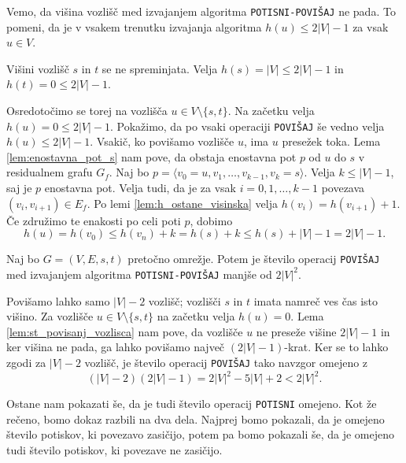 \documentclass[mat1]{fmfdelo}
\begin{document}
\begin{opomba}
Vemo, da višina vozlišč med izvajanjem algoritma \texttt{POTISNI-POVIŠAJ} ne pada. To pomeni, da je v vsakem trenutku izvajanja algoritma $h(u) \leq 2|V| - 1$ za vsak $u \in V$.
\end{opomba}

\begin{dokaz}
Višini vozlišč $s$ in $t$ se ne spreminjata. Velja $h(s) = |V| \leq 2|V| -1$ in $h(t) = 0 \leq 2|V|-1$.

Osredotočimo se torej na vozlišča $u \in V \setminus \{s,t\}$. Na začetku velja $h(u) = 0 \leq 2|V|-1$. Pokažimo, da po vsaki operaciji \texttt{POVIŠAJ} še vedno velja $h(u) \leq 2|V|-1$. Vsakič, ko povišamo vozlišče $u$, ima $u$ presežek toka. Lema \ref{lem:enostavna_pot_s} nam pove, da obstaja enostavna pot $p$ od $u$ do $s$ v residualnem grafu $G_f$. Naj bo $p = \langle v_0 = u, v_1, \dotsc, v_{k-1}, v_k = s\rangle$. Velja $k \leq |V|-1$, saj je $p$ enostavna pot. Velja tudi, da je za vsak $i = 0,1,\dotsc,k-1$ povezava $(v_i, v_{i+1}) \in E_f$. Po lemi \ref{lem:h_ostane_visinska} velja $h(v_i) = h(v_{i+1}) +1$. Če združimo te enakosti po celi poti $p$, dobimo \[h(u) = h(v_0) \leq h(v_n) + k = h(s) + k \leq h(s) + |V| - 1 = 2|V| - 1.\]
\end{dokaz}

\begin{posledica}\label{pos:om_st_op_povisaj}
Naj bo $G=(V,E,s,t)$ pretočno omrežje. Potem je število operacij \texttt{POVIŠAJ} med izvajanjem algoritma \texttt{POTISNI-POVIŠAJ} manjše od $2|V|^2$.
\end{posledica}

\begin{dokaz}
Povišamo lahko samo $|V| -2$ vozlišč; vozlišči $s$ in $t$ imata namreč ves čas isto višino. Za vozlišče $u \in V \setminus \{s,t\}$ na začetku velja $h(u) = 0$. Lema \ref{lem:st_povisanj_vozlisca} nam pove, da vozlišče $u$ ne preseže višine $2|V| - 1$ in ker višina ne pada, ga lahko povišamo največ $(2|V|-1)$-krat. Ker se to lahko zgodi za $|V|-2$ vozlišč, je število operacij \texttt{POVIŠAJ} tako navzgor omejeno z \[(|V|-2)(2|V|-1) = 2|V|^2 - 5|V| + 2 < 2|V|^2.\]
\end{dokaz}

Ostane nam pokazati še, da je tudi število operacij \texttt{POTISNI} omejeno. Kot že rečeno, bomo dokaz razbili na dva dela. Najprej bomo pokazali, da je omejeno število potiskov, ki povezavo zasičijo, potem pa bomo pokazali še, da je omejeno tudi število potiskov, ki povezave ne zasičijo.
\end{document}

